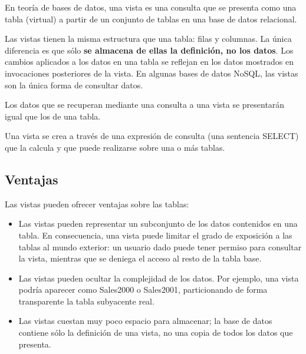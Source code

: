 \documentclass[12pt, fleqn]{article}                             %
\begin{document}
    En teoría de bases de datos, una vista es una consulta que se presenta como una tabla (virtual)
    a partir de un conjunto de tablas en una base de datos relacional.

    Las vistas tienen la misma estructura que una tabla: filas y columnas.
    La única diferencia es que sólo \textbf{se almacena de ellas la definición, no los datos}.
    Los cambios aplicados a los datos en una tabla se reflejan en los datos mostrados en invocaciones
    posteriores de la vista.
    En algunas bases de datos NoSQL, las vistas son la única forma de consultar datos.

    Los datos que se recuperan mediante una consulta a una vista se presentarán igual que los de una tabla.

    Una vista se crea a través de una expresión de consulta (una sentencia SELECT) que la calcula y que puede
    realizarse sobre una o más tablas.


    \subsection{Ventajas}

        Las vistas pueden ofrecer ventajas sobre las tablas:

        \begin{itemize}

            \item
                Las vistas pueden representar un subconjunto de los datos contenidos en una tabla.
                En consecuencia, una vista puede limitar el grado de exposición a las tablas al mundo exterior:
                un usuario dado puede tener permiso para consultar la vista, mientras que se deniega el acceso
                al resto de la tabla base.

            \item
                Las vistas pueden ocultar la complejidad de los datos.
                Por ejemplo, una vista podría aparecer como Sales2000 o Sales2001, particionando
                de forma transparente la tabla subyacente real.

            \item 
                Las vistas cuestan muy poco espacio para almacenar; la base de datos contiene sólo
                la definición de una vista, no una copia de todos los datos que presenta.

        \end{itemize}
\end{document}
